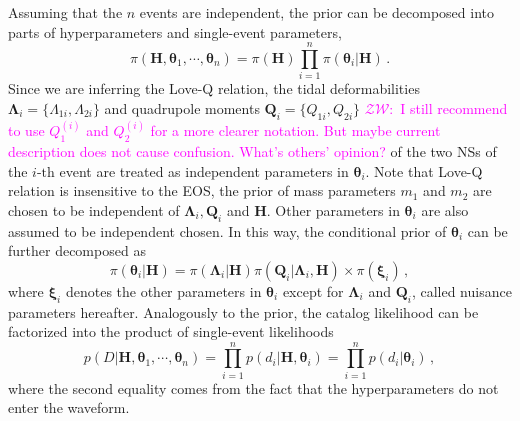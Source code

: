 \documentclass[a4paper,11pt]{article}
\newcommand{\ZW}[1]{\textcolor{magenta}{$\mathcal{ZW}$:~#1}}
\begin{document}
Assuming that the $n$ events are independent, the 
prior can be decomposed into parts of hyperparameters and single-event parameters,
\begin{equation}
\label{bayes3}
\pi(\bm{H},\bm{\theta}_1,\cdots,\bm{\theta}_n) = \pi(\bm{H}) \prod_{i=1}^n \pi(\bm{\theta}_i|\bm{H})\,.
\end{equation}
Since we are inferring the Love-Q relation, the tidal deformabilities $\bm
{\Lambda}_i=\{\Lambda_{1i},\Lambda_{2i}\}$ and quadrupole moments $\bm{Q}_i=\{Q_
{1i},Q_{2i}\}$ \ZW{I still recommend to use $Q^{(i)}_1$ and $Q^{(i)}_2$ for a
more clearer notation. But maybe current description does not cause confusion.
What's others' opinion?
} of the two NSs of the $i\text{-th}$ event are treated as independent
parameters in $\bm{\theta}_i$. Note that Love-Q relation is insensitive 
to the EOS, the prior of mass parameters $m_1$ and $m_2$ are chosen to be
independent of $\bm{\Lambda}_i, \bm{Q}_i$ and $\bm{H}$. Other parameters in
$\bm{\theta}_i$ are also assumed to be independent chosen. 
In this way, the conditional prior of $\bm{\theta}_i$
 can be further decomposed as
\begin{equation}
\label{prior}
\pi(\bm{\theta}_i|\bm{H})=\pi(\bm{\Lambda}_i|\bm{H})\pi(\bm{Q}_i|\bm{\Lambda}_i,\bm{H})\times\pi(\bm{\xi}_i)\,,
\end{equation}
where $\bm{\xi}_i$ denotes the other parameters in $\bm{\theta}_i$ except for
$\bm{\Lambda}_i$ and $\bm{Q}_i$, called nuisance parameters hereafter.
Analogously to the prior, the catalog likelihood can be factorized
 into the product of single-event likelihoods
\begin{equation}
    p(D|\bm{H},\bm{\theta}_1,\cdots,\bm{\theta}_n)=\prod_{i=1}^{n}p(d_i|\bm{H},\bm{\theta}_i)=\prod_{i=1}^{n}p(d_i|\bm{\theta}_i)\,,\label{eq:catalog_likelihood}
\end{equation}
where the second equality comes from the fact that the hyperparameters do not enter the waveform.
\end{document}
